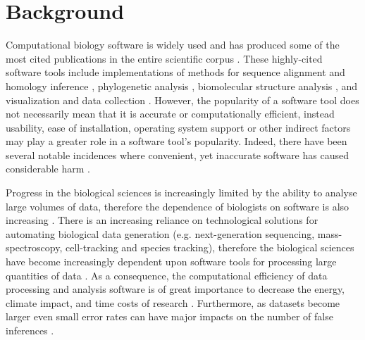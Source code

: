 \documentclass[fleqn,10pt]{SelfArx} %
\begin{document}
\section*{Background}
Computational biology software is widely used and has produced some of
the most cited publications in the entire scientific corpus
\cite{Perez-Iratxeta2007-lv,Van_Noorden2014-kc,Wren2016-xy}. These
highly-cited software tools include implementations of methods for sequence
alignment and homology inference \cite{Altschul1990-ht,Thompson1994-eu,Thompson1997-rl,Altschul1997-ga},
phylogenetic analysis \cite{Felsenstein1985-lj,Saitou1987-zl,Posada1998-qq,Ronquist2003-yh,Tamura2007-ei}, 
biomolecular structure analysis \cite{Sheldrick1990-kc,Sheldrick2008-xy,Jones1991-ik,Laskowski1993-vi,Otwinowski1997-xj}, and
visualization and data collection \cite{Kraulis1991-lt,Berman2000-to}. 
However, the popularity of a
software tool does not necessarily mean that it is accurate or
computationally efficient, instead usability, ease of installation,
operating system support or other indirect factors may play a greater role in a software
tool's popularity. Indeed, there have been several notable incidences where
convenient, yet inaccurate software has caused considerable harm
\cite{leveson1993investigation,cummings2020regulating,Herkert:2020}.

Progress in the biological sciences is increasingly limited by the
ability to analyse large volumes of data, therefore the
dependence of biologists on software is also increasing
\cite{Marx2013-zi}. There is an increasing reliance on technological
solutions for automating biological data generation
(e.g. next-generation sequencing, mass-spectroscopy, cell-tracking and
species tracking), therefore the biological sciences have become
increasingly dependent upon software tools for processing
large quantities of data \cite{Marx2013-zi}. As a consequence, the
computational efficiency of data processing and analysis software is
of great importance to decrease the energy, climate impact, and time costs of research
\cite{Gombiner2011-md}. Furthermore,  as datasets become
larger even small error rates can have
major impacts on the number of false inferences \cite{Storey2003-cv}.
\end{document}

